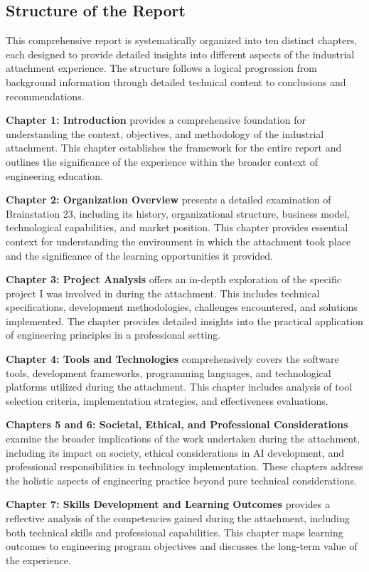 \documentclass[12pt,a4paper]{article}
\begin{document}
\subsection{Structure of the Report}
This comprehensive report is systematically organized into ten distinct chapters, each designed to provide detailed insights into different aspects of the industrial attachment experience. The structure follows a logical progression from background information through detailed technical content to conclusions and recommendations.

\textbf{Chapter 1: Introduction} provides a comprehensive foundation for understanding the context, objectives, and methodology of the industrial attachment. This chapter establishes the framework for the entire report and outlines the significance of the experience within the broader context of engineering education.

\textbf{Chapter 2: Organization Overview} presents a detailed examination of Brainstation 23, including its history, organizational structure, business model, technological capabilities, and market position. This chapter provides essential context for understanding the environment in which the attachment took place and the significance of the learning opportunities it provided.

\textbf{Chapter 3: Project Analysis} offers an in-depth exploration of the specific project I was involved in during the attachment. This includes technical specifications, development methodologies, challenges encountered, and solutions implemented. The chapter provides detailed insights into the practical application of engineering principles in a professional setting.

\textbf{Chapter 4: Tools and Technologies} comprehensively covers the software tools, development frameworks, programming languages, and technological platforms utilized during the attachment. This chapter includes analysis of tool selection criteria, implementation strategies, and effectiveness evaluations.

\textbf{Chapters 5 and 6: Societal, Ethical, and Professional Considerations} examine the broader implications of the work undertaken during the attachment, including its impact on society, ethical considerations in AI development, and professional responsibilities in technology implementation. These chapters address the holistic aspects of engineering practice beyond pure technical considerations.

\textbf{Chapter 7: Skills Development and Learning Outcomes} provides a reflective analysis of the competencies gained during the attachment, including both technical skills and professional capabilities. This chapter maps learning outcomes to engineering program objectives and discusses the long-term value of the experience.
\end{document}
